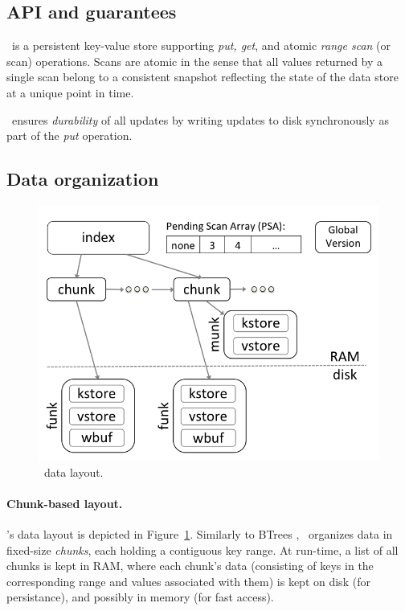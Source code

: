 

\subsection{API and guarantees}

\sys\ is a persistent key-value store supporting \emph{put, get}, and atomic \emph{range scan} (or scan) operations. 
Scans are atomic in the sense that all values returned by a single scan belong to a consistent snapshot reflecting
the state of the data store at a unique point in time.


\sys\ ensures \emph{durability} of all updates by writing updates to disk synchronously as part of the \emph{put} operation.

\subsection{Data organization}

\begin{figure}[htb]
\centerline{
\includegraphics[width=0.9\columnwidth]{PiWi.png}
}
\caption{\sys\ data layout.}
\label{fig:layout}
\end{figure}

\paragraph{Chunk-based layout.}

\sys's data layout is depicted in Figure~\ref{fig:layout}.
Similarly to BTrees , 
\sys\ organizes data in fixed-size \emph{chunks}, each holding a contiguous key range.
At run-time, a list of all chunks is kept in RAM, where each chunk's data 
(consisting of keys in the corresponding range and values associated with them) 
is kept on disk (for persistance), and possibly in memory (for fast access). 

